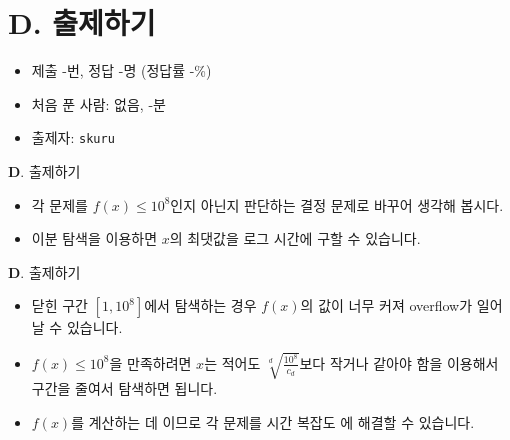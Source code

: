 \section{D. 출제하기}

\begin{frame} %
    \begin{itemize}
        \item 제출 -번, 정답 -명 (정답률 -\%)
        \item 처음 푼 사람: 없음, -분
        \item 출제자: \texttt{skuru}
    \end{itemize}
\end{frame}

\begin{frame}{\textbf{D}. 출제하기}
    \begin{itemize}
        \item 각 문제를 $f(x) \le 10^8$인지 아닌지 판단하는 결정 문제로 바꾸어 생각해 봅시다.
        \item 이분 탐색을 이용하면 $x$의 최댓값을 로그 시간에 구할 수 있습니다.
    \end{itemize}
\end{frame}

\begin{frame}{\textbf{D}. 출제하기}
    \begin{itemize}
        \item 닫힌 구간 $[1, 10^8]$에서 탐색하는 경우 $f(x)$의 값이 너무 커져 overflow가 일어날 수 있습니다.
        \item $f(x) \le 10^8$을 만족하려면 $x$는 적어도 $\sqrt[d]{\frac{10^8}{c_d}}$보다 작거나 같아야 함을 이용해서 구간을 줄여서 탐색하면 됩니다.
        \item $f(x)$를 계산하는 데 이므로 각 문제를 시간 복잡도 에 해결할 수 있습니다.
    \end{itemize}
\end{frame}